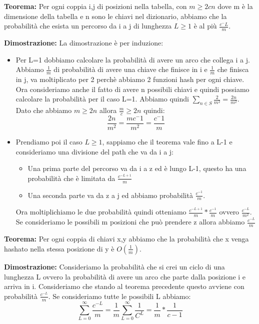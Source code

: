 \documentclass[14pt]{extreport}
\begin{document}
\textbf{Teorema:} Per ogni coppia i,j di posizioni nella tabella, con $m\geq 2cn$ dove m è la dimensione della tabella e n sono le chiavi nel dizionario, abbiamo che la probabilità che esista un percorso da i a j di lunghezza $L \geq 1$ è al più $\frac{c^-L}{m}$. 

\textbf{Dimostrazione:} La dimostrazione è per induzione:
\begin{itemize}
\item Per L=1 dobbiamo calcolare la probabilità di avere un arco che collega i a j. Abbiamo $\frac{1}{m}$ di probabilità di avere una chiave che finisce in i e $\frac{1}{m}$ che finisca in j, va moltiplicato per 2 perchè abbiamo 2 funzioni hash per ogni chiave. Ora consideriamo anche il fatto di avere n possibili chiavi e quindi possiamo calcolare la probabilità per il caso L=1. Abbiamo quindi $\sum_{n \in S}\frac{2}{m^2} = \frac{2n}{m^2}$. Dato che abbiamo $m\geq 2n$ allora $\frac{m}{c}\geq 2n$ quindi:
\begin{equation}
\frac{2n}{m^2} = \frac{mc^-1}{m^2} = \frac{c^-1}{m}
\end{equation}

\item Prendiamo poi il caso $L\geq1$, sappiamo che il teorema vale fino a L-1 e consideriamo una divisione del path che va da i a j:
\begin{itemize}
\item Una prima parte del percorso va da i a z ed è lungo L-1, questo ha una probabilità che è limitata da $\frac{c^{-L+1}}{m}$
\item Una seconda parte va da z a j ed abbiamo probabilità $\frac{c^{-1}}{m}$. 
\end{itemize}
Ora moltiplichiamo le due probabilità quindi otteniamo $\frac{c^{-L+1}}{m}*\frac{c^{-1}}{m}$ ovvero $\frac{c^{-L}}{m^2}$. Se consideriamo le possibili m posizioni che può prendere z allora abbiamo $\frac{c^{-L}}{m}$
\end{itemize}


\textbf{Teorema:} Per ogni coppia di chiavi x,y abbiamo che la probabilità che x venga hashato nella stessa posizione di y è $O(\frac{1}{m})$.

\textbf{Dimostrazione:} Consideriamo la probabilità che si crei un ciclo di una lunghezza L ovvero la probabilità di avere un arco che parte dalla posizione i e arriva in i. Consideriamo che stando al teorema precedente questo avviene con probabilità $\frac{c^{-L}}{m}$. 
Se consideriamo tutte le possibili L abbiamo:
\begin{equation}
\sum^{\infty}_{L=0}\frac{c^{-L}}{m} = \frac{1}{m}\sum^{\infty}_{L=0}\frac{1}{C^L} = \frac{1}{m}*\frac{1}{c-1}
\end{equation}
\end{document}
